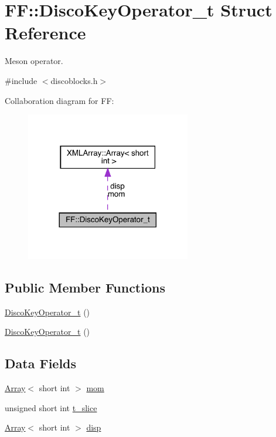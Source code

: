 \hypertarget{structFF_1_1DiscoKeyOperator__t}{}\section{FF\+:\+:Disco\+Key\+Operator\+\_\+t Struct Reference}
\label{structFF_1_1DiscoKeyOperator__t}


Meson operator.  




{\ttfamily \#include $<$discoblocks.\+h$>$}



Collaboration diagram for FF\+:\nopagebreak
\begin{figure}[H]
\begin{center}
\leavevmode
\includegraphics[width=204pt]{dc/d87/structFF_1_1DiscoKeyOperator__t__coll__graph}
\end{center}
\end{figure}
\subsection*{Public Member Functions}
\begin{DoxyCompactItemize}
\item 
\mbox{\hyperlink{structFF_1_1DiscoKeyOperator__t_ab4dabc722e586bb004065179dc9b4369}{Disco\+Key\+Operator\+\_\+t}} ()
\item 
\mbox{\hyperlink{structFF_1_1DiscoKeyOperator__t_ab4dabc722e586bb004065179dc9b4369}{Disco\+Key\+Operator\+\_\+t}} ()
\end{DoxyCompactItemize}
\subsection*{Data Fields}
\begin{DoxyCompactItemize}
\item 
\mbox{\hyperlink{classXMLArray_1_1Array}{Array}}$<$ short int $>$ \mbox{\hyperlink{structFF_1_1DiscoKeyOperator__t_a116d34044c3a792c86bf02e2097823f4}{mom}}
\item 
unsigned short int \mbox{\hyperlink{structFF_1_1DiscoKeyOperator__t_aa9e2b29ba80312c80aa53346f34ce150}{t\+\_\+slice}}
\item 
\mbox{\hyperlink{classXMLArray_1_1Array}{Array}}$<$ short int $>$ \mbox{\hyperlink{structFF_1_1DiscoKeyOperator__t_a7d29368ccd597248408ac26bf3470e4b}{disp}}
\end{DoxyCompactItemize}


